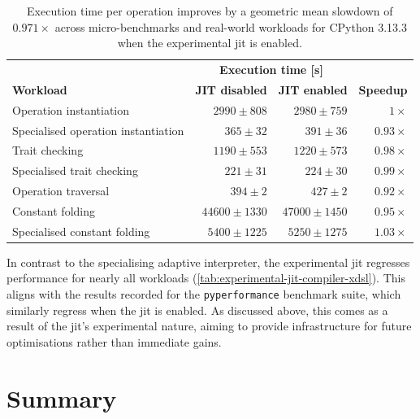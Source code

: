 \begin{table}[H]
  \caption{Execution time per operation improves by a geometric mean slowdown of $0.971\times$ across micro-benchmarks and real-world workloads for CPython 3.13.3 when the experimental \ac{jit} is enabled.}
  \label{tab:experimental-jit-compiler-xdsl}
  \centering
  \begin{tabular}{lrrr}
    \toprule
    & \multicolumn{2}{c}{\textbf{Execution time [s]}} \\
    \cmidrule(r){2-3}
    \textbf{Workload}& \textbf{JIT disabled} & \textbf{JIT enabled} & \textbf{Speedup} \\
    \midrule
    Operation instantiation & $2990 \pm 808$ & $2980 \pm 759$ & $1\times$ \\
    Specialised operation instantiation & $365 \pm 32$ & $391 \pm 36$ & $0.93\times$ \\
    Trait checking & $1190 \pm 553$ & $1220 \pm 573$ & $0.98\times$ \\
    Specialised trait checking & $221 \pm 31$ & $224 \pm 30$ & $0.99\times$ \\
    Operation traversal & $394 \pm 2$ & $427 \pm 2$ & $0.92\times$ \\ %
    Constant folding & $44600 \pm 1330$ & $47000 \pm 1450$ & $0.95\times$ \\
    Specialised constant folding & $5400 \pm 1225$ & $5250 \pm 1275$ & $1.03\times$ \\
    \bottomrule
  \end{tabular}
\end{table}

In contrast to the specialising adaptive interpreter, the experimental \ac{jit} regresses performance for nearly all workloads (\autoref{tab:experimental-jit-compiler-xdsl}).
This aligns with the results recorded for the \texttt{pyperformance} benchmark suite, which similarly regress when the \ac{jit} is enabled.
As discussed above, this comes as a result of the \ac{jit}'s experimental nature, aiming to provide infrastructure for future optimisations rather than immediate gains.



\section{Summary}
\label{chap:impact-cpython-pattern-summary}

